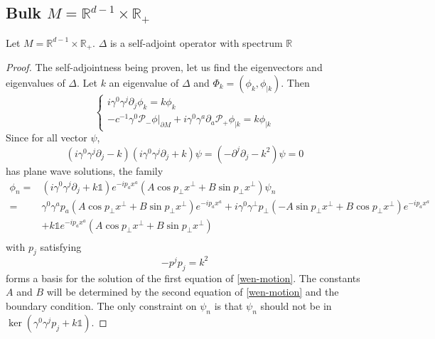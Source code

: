 \subsection{Bulk $M = \mathbb{R}^{d-1} \times \mathbb{R}_+$}\label{wen-subsect1}
\begin{proposition}
Let $M = \mathbb{R}^{d-1} \times \mathbb{R}_+$. $\Delta$ is a self-adjoint operator with spectrum $\mathbb{R}$
\end{proposition}
\begin{proof}
The self-adjointness being proven, let us find the eigenvectors and eigenvalues of $\Delta$. Let $k$ an eigenvalue of $\Delta$ and $\Phi_k = (\phi_k, \phi_{| k})$. Then
\begin{equation}\label{wen-motion2}
\begin{cases}
i \gamma^0 \gamma^j \partial_j \phi_k = k \phi_k \\
-c^{-1} \gamma^0 \mathcal{P}_- \phi\vert_{\partial M} + i \gamma^0 \gamma^a \partial_a \mathcal{P}_+ \phi_{| k} = k \phi_{| k}
\end{cases}
\end{equation}
Since for all vector $\psi$,
\begin{equation*}
(i\gamma^0 \gamma^j\partial_j - k )(i\gamma^0 \gamma^j\partial_j + k )\psi = 
(- \partial^j\partial_j - k^2) \psi = 0
\end{equation*}
has plane wave solutions, 
the family
\begin{equation*}
\begin{split}
\phi_n = & (i\gamma^0\gamma^j\partial_j + k \mathbb{1}) e^{-ip_a x^a }(A\cos p_\bot x^\bot + B \sin p_\bot x^\bot) \psi_n \\
 = &\gamma^0\gamma^a p_a (A \cos p_\bot x^\bot + B \sin p_\bot x^\bot)e^{-ip_a x^a}
+ i\gamma^0\gamma^\bot p_\bot (-A \sin p_\bot x^\bot + B \cos p_\bot x^\bot) e^{-ip_a x^a} \\
& + k \mathbb{1} e^{-ip_a x^a}(A\cos p_\bot x^\bot + B \sin p_\bot x^\bot)  \\
\end{split}
\end{equation*}
with $p_j$ satisfying
\begin{equation*}
- p^j p_j = k^2
\end{equation*}
forms a basis for the solution of the first equation of \cref{wen-motion}. 
The constants $A$ and $B$ will be determined by the second equation of \cref{wen-motion} and the boundary condition. 
The only constraint on $\psi_n$ is that $\psi_n$ should not be in $\ker( \gamma^0 \gamma^j p_j + k \mathbb{1})$. 

\end{proof}
